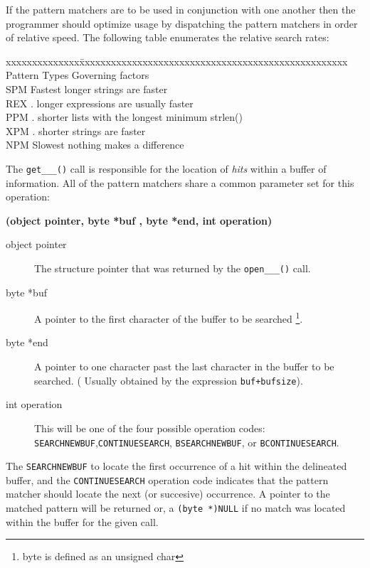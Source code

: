 If the pattern matchers are to be used in conjunction with one another
then the programmer should optimize usage by dispatching the pattern
matchers in order of relative speed. The following table enumerates
the relative search rates:

\begin{tabbing}
xxxxxxxxxxxxxx\=xxxxxxxxxxxxxxxxxxxxxxxxxxxxxxxxxxxxxxxxxxxxxxxxxxx\kill
Pattern Types \>Governing factors                                  \\
SPM Fastest   \>longer strings are faster                          \\
REX .         \>longer expressions are usually faster              \\
PPM .         \>shorter lists with the longest minimum strlen()    \\
XPM .         \>shorter strings are faster                         \\
NPM Slowest   \>nothing makes a difference                         \\
\end{tabbing}

The \verb`get___()` call is responsible for the location of {\em hits}
within a buffer of information. All of the pattern matchers share
a common parameter set for this operation:

{\bf (object pointer, byte *buf , byte *end, int operation)}

\begin{description}

\item[object pointer] The structure pointer that was returned by the
\verb`open___()` call.

\item[byte *buf] A pointer to the first character of the buffer to
be searched \footnote{byte is defined as an unsigned char}.

\item[byte *end] A pointer to one character past the last character
in the buffer to be searched. ( Usually obtained by the expression
\verb`buf+bufsize`).

\item[int operation] This will be one of the four possible operation
codes: \verb`SEARCHNEWBUF`,\verb`CONTINUESEARCH`,  \verb`BSEARCHNEWBUF`,
or \verb`BCONTINUESEARCH`.

\end{description}

The \verb`SEARCHNEWBUF` to locate the first occurrence of a hit within the
delineated buffer, and the \verb`CONTINUESEARCH` operation code indicates
that the pattern matcher should locate the next (or succesive) occurrence.
A pointer to the matched pattern will be returned or, a
\verb`(byte *)NULL` if no match was located within the buffer
for the given call.

